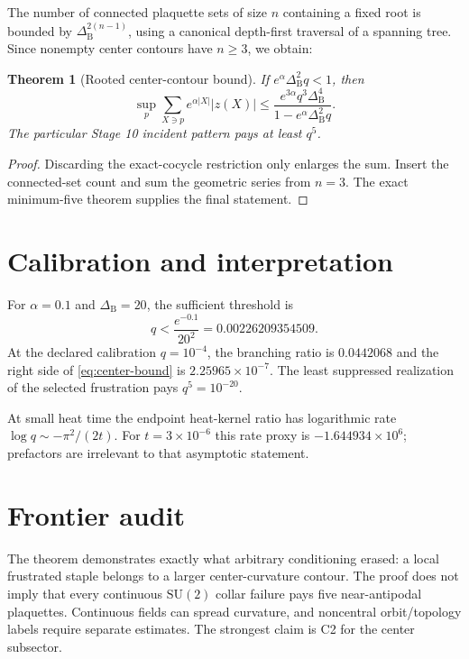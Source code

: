 \documentclass[11pt]{article}
\newtheorem{theorem}{Theorem}[section]
\begin{document}
The number of connected plaquette sets of size $n$ containing a fixed root is
bounded by $\Delta_{\mathrm B}^{2(n-1)}$, using a canonical depth-first traversal of a
spanning tree.  Since nonempty center contours have $n\geq3$, we obtain:

\begin{theorem}[Rooted center-contour bound]
If $e^\alpha\Delta_{\mathrm B}^2q<1$, then
\begin{equation}
 \sup_p\sum_{X\ni p}e^{\alpha|X|}|z(X)|
 \leq
 \frac{e^{3\alpha}q^3\Delta_{\mathrm B}^4}{1-e^\alpha\Delta_{\mathrm B}^2q}.
 \label{eq:center-bound}
\end{equation}
The particular Stage 10 incident pattern pays at least $q^5$.
\end{theorem}
\begin{proof}
Discarding the exact-cocycle restriction only enlarges the sum.  Insert the
connected-set count and sum the geometric series from $n=3$.  The exact
minimum-five theorem supplies the final statement.
\end{proof}

\section{Calibration and interpretation}

For $\alpha=0.1$ and $\Delta_{\mathrm B}=20$, the sufficient threshold is
\[
 q<\frac{e^{-0.1}}{20^2}=0.00226209354509.
\]
At the declared calibration $q=10^{-4}$, the branching ratio is
$0.0442068$ and the right side of \eqref{eq:center-bound} is
$2.25965\times10^{-7}$.  The least suppressed realization of the selected
frustration pays $q^5=10^{-20}$.

At small heat time the endpoint heat-kernel ratio has logarithmic rate
$\log q\sim-\pi^2/(2t)$.  For $t=3\times10^{-6}$ this rate proxy is
$-1.644934\times10^6$; prefactors are irrelevant to that asymptotic statement.

\section{Frontier audit}

The theorem demonstrates exactly what arbitrary conditioning erased: a local
frustrated staple belongs to a larger center-curvature contour.  The proof
does not imply that every continuous $\mathrm{SU}(2)$ collar failure pays five
near-antipodal plaquettes.  Continuous fields can spread curvature, and
noncentral orbit/topology labels require separate estimates.  The strongest
claim is C2 for the center subsector.
\end{document}

